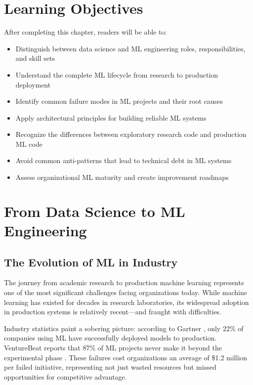 \section{Learning Objectives}

After completing this chapter, readers will be able to:
\begin{itemize}
    \item Distinguish between data science and ML engineering roles, responsibilities, and skill sets
    \item Understand the complete ML lifecycle from research to production deployment
    \item Identify common failure modes in ML projects and their root causes
    \item Apply architectural principles for building reliable ML systems
    \item Recognize the differences between exploratory research code and production ML code
    \item Avoid common anti-patterns that lead to technical debt in ML systems
    \item Assess organizational ML maturity and create improvement roadmaps
\end{itemize}

\section{From Data Science to ML Engineering}

\subsection{The Evolution of ML in Industry}

The journey from academic research to production machine learning represents one of the most significant challenges facing organizations today. While machine learning has existed for decades in research laboratories, its widespread adoption in production systems is relatively recent—and fraught with difficulties.

Industry statistics paint a sobering picture: according to Gartner \citep{gartner2020}, only 22\% of companies using ML have successfully deployed models to production. VentureBeat reports that 87\% of ML projects never make it beyond the experimental phase \citep{venturebeat2019}. These failures cost organizations an average of \$1.2 million per failed initiative, representing not just wasted resources but missed opportunities for competitive advantage.

